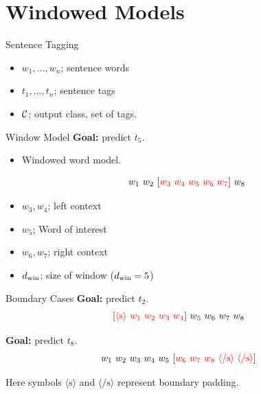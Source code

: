 \documentclass{beamer}
\begin{document}

\section{Windowed Models}




\begin{frame}{Sentence Tagging}
  \begin{itemize}
  \item $w_1, \ldots, w_n$; sentence words
    \air
  \item $t_1, \ldots, t_n$; sentence tags
    \air

  \item $\mathcal{C}$; output class, set of tags.
  \end{itemize}
\end{frame}


\begin{frame}{Window Model}
  \textbf{Goal:} predict $t_5$.


  \begin{itemize}
  \item Windowed word model.

  \[ w_1\ w_2\ [\textcolor{red}{w_3\ w_4\ w_5\ w_6\ w_7}]\ w_8 \]

  \item $w_3, w_4$; left context
  \item $w_5$; Word of interest
  \item $w_6, w_7$; right context

  \item ${d_{\mathrm{win}}}$; size of window (${d_{\mathrm{win}}} = 5$)
  \end{itemize}
\end{frame}


\begin{frame}{Boundary Cases}
  \textbf{Goal:} predict $t_2$.
  \[ [\textcolor{red}{ \langle\mathrm{s}\rangle \ w_1\ w_2\ w_3\ w_4}]\ w_5\ w_6\ w_7\ w_8 \]


  \textbf{Goal:} predict $t_8$.
  \[  w_1\ w_2\ w_3\ w_4\ w_5\ [\textcolor{red}{w_6\ w_7\ w_8\  \langle\mathrm{/s}\rangle\ \langle\mathrm{/s}\rangle}] \]

  Here symbols $\langle\mathrm{s}\rangle$ and $\langle\mathrm{/s}\rangle$ represent boundary padding.
\end{frame}
\end{document}
